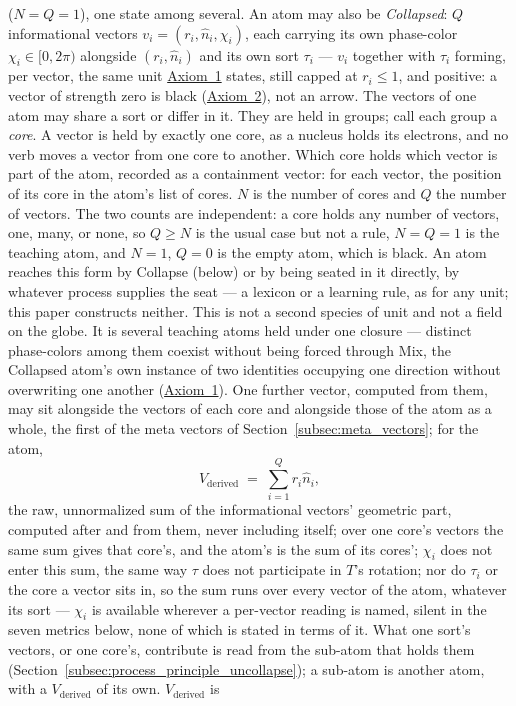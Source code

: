 \documentclass[12pt, a4paper]{article}
\begin{document}
($N=Q=1$), one state among several. An atom may also be \emph{Collapsed}: $Q$ informational
vectors $v_i=(r_i,\hat n_i,\chi_i)$, each carrying its own phase-color $\chi_i\in[0,2\pi)$ alongside $(r_i,\hat n_i)$ and its own sort $\tau_i$ --- $v_i$ together with $\tau_i$ forming, per vector, the same unit \hyperref[subsec:axiom1]{Axiom~1} states, still capped at $r_i\le 1$, and positive: a vector of strength zero is black
(\hyperref[subsec:axiom_null]{Axiom~2}), not an arrow. The vectors of one atom may share a sort or differ in it. They are held in groups; call each group a \emph{core}. A vector is held by exactly one core, as a nucleus holds its electrons, and no verb moves a vector from one core to another. Which core holds which vector is part of the atom, recorded as a containment vector: for each vector, the position of its core in the atom's list of cores. $N$ is the number of cores and $Q$ the number of vectors. The
two counts are independent: a core holds any number of vectors, one,
many, or none, so $Q\ge N$ is the usual case but not a rule, $N=Q=1$
is the teaching atom, and $N=1$, $Q=0$ is the empty atom, which is
black. An atom reaches this form by Collapse (below) or by being
seated in it directly, by whatever process supplies the seat --- a
lexicon or a learning rule, as for any unit; this paper constructs
neither. This is not a second species of unit and not a field on the
globe. It is several teaching atoms held under one closure ---
distinct phase-colors among them coexist without being forced
through Mix, the Collapsed atom's own instance of two identities occupying
one direction without overwriting one another
(\hyperref[subsec:axiom1]{Axiom~1}). One further vector, computed from
them, may sit alongside the vectors of each core and alongside those of
the atom as a whole, the first of the meta vectors of
Section~\ref{subsec:meta_vectors}; for the atom,
\[
V_{\text{derived}} \;=\; \sum_{i=1}^{Q} r_i\hat n_i,
\]
the raw, unnormalized sum of the informational vectors' geometric
part, computed after and from them, never including itself; over one core's
vectors the same sum gives that core's, and the atom's is the sum of its
cores'; $\chi_i$ does not enter this sum, the same way $\tau$ does not participate in $T$'s rotation; nor do $\tau_i$ or the core a vector sits in, so the sum runs over every vector of the atom, whatever its sort --- $\chi_i$ is available wherever a per-vector reading is named, silent in the seven metrics below, none of which is stated in terms of it. What one sort's vectors, or one core's, contribute is read from the sub-atom that holds them (Section~\ref{subsec:process_principle_uncollapse}); a sub-atom is another atom, with a $V_{\text{derived}}$ of its own. $V_{\text{derived}}$ is
\end{document}
